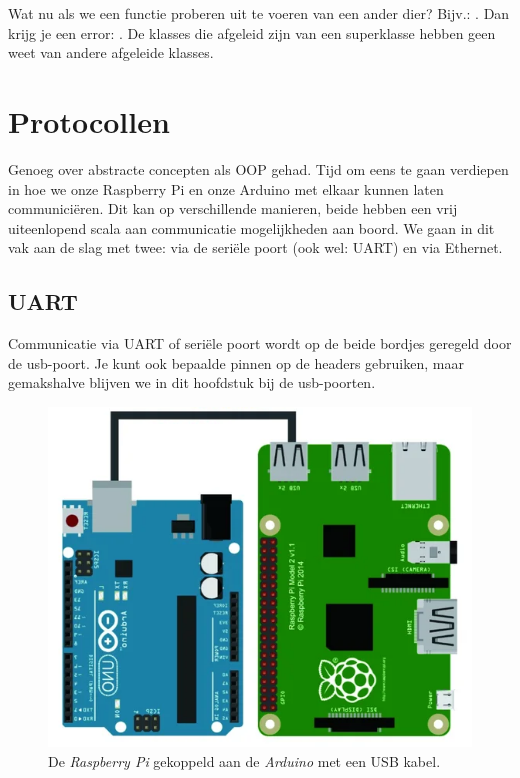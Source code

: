 \begin{remark}
  Wat nu als we een functie proberen uit te voeren van een ander dier? \newline 
  Bijv.: . Dan krijg je een error: \newline
  .\newline
  De klasses die afgeleid zijn van een superklasse hebben geen weet van andere afgeleide klasses.
\end{remark}

\newpage

\section{Protocollen}
Genoeg over abstracte concepten als OOP gehad. Tijd om eens te gaan verdiepen in hoe we onze Raspberry Pi en onze Arduino met elkaar kunnen laten communiciëren. Dit kan op verschillende manieren, beide hebben een vrij uiteenlopend scala aan communicatie mogelijkheden aan boord. We gaan in dit vak aan de slag met twee: via de seriële poort (ook wel: UART) en via Ethernet.

\subsection{UART}
Communicatie via UART of seriële poort wordt op de beide bordjes geregeld door de usb-poort. Je kunt ook bepaalde pinnen op de headers gebruiken, maar gemakshalve blijven we in dit hoofdstuk bij de usb-poorten.

\begin{figure}[h!]
\centering\includegraphics[scale=0.5]{Pictures/chapter08/usb.png}
  \caption{\small De \textit{Raspberry Pi} gekoppeld aan de \textit{Arduino} met een USB kabel.} 
\label{fig:usb} %
\end{figure}

